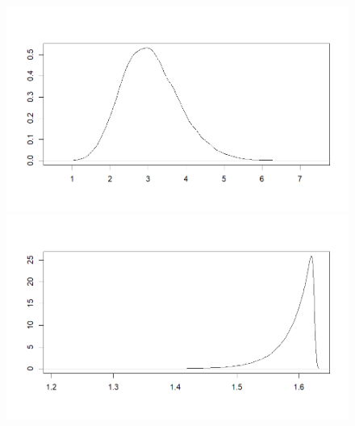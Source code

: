 \documentclass{Class/julia}
\begin{document}
\begin{figure}[!ht]
    \centering
    \begin{minipage}{0.45\textwidth}
        \centering
        \includegraphics[width=\linewidth]{rytgaard1990/density_alpha.png}
        \subcaption{\( \alpha \)}
    \end{minipage}%
    \hfill
    \begin{minipage}{0.45\textwidth}
        \centering
        \includegraphics[width=\linewidth]{rytgaard1990/density_beta.png}
        \subcaption{\( \beta \)}
    \end{minipage} \\
    
    

\end{figure}
\end{document}

